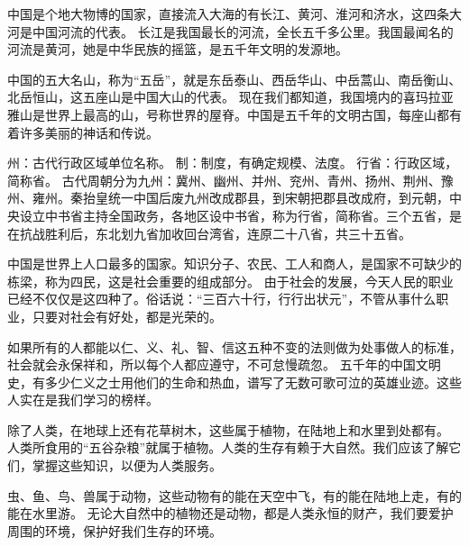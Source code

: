 \documentclass[avery5371,grid]{flashcards}
\begin{document}
{中国是个地大物博的国家，直接流入大海的有长江、黄河、淮河和济水，这四条大河是中国河流的代表。} %
{长江是我国最长的河流，全长五千多公里。我国最闻名的河流是黄河，她是中华民族的摇篮，是五千年文明的发源地。} %

{中国的五大名山，称为“五岳”，就是东岳泰山、西岳华山、中岳蒿山、南岳衡山、北岳恒山，这五座山是中国大山的代表。} %
{现在我们都知道，我国境内的喜玛拉亚雅山是世界上最高的山，号称世界的屋脊。中国是五千年的文明古国，每座山都有着许多美丽的神话和传说。} %

{州：古代行政区域单位名称。 制：制度，有确定规模、法度。 行省：行政区域，简称省。} %
{古代周朝分为九州：冀州、幽州、并州、兖州、青州、扬州、荆州、豫州、雍州。秦抬皇统一中国后废九州改成郡县，到宋朝把郡县改成府，到元朝，中央设立中书省主持全国政务，各地区设中书省，称为行省，简称省。三个五省，是在抗战胜利后，东北划九省加收回台湾省，连原二十八省，共三十五省。} %

{中国是世界上人口最多的国家。知识分子、农民、工人和商人，是国家不可缺少的栋梁，称为四民，这是社会重要的组成部分。} %
{由于社会的发展，今天人民的职业已经不仅仅是这四种了。俗话说：“三百六十行，行行出状元”，不管从事什么职业，只要对社会有好处，都是光荣的。} %




{如果所有的人都能以仁、义、礼、智、信这五种不变的法则做为处事做人的标准，社会就会永保祥和，所以每个人都应遵守，不可怠慢疏忽。} %
{五千年的中国文明史，有多少仁义之士用他们的生命和热血，谱写了无数可歌可泣的英雄业迹。这些人实在是我们学习的榜样。} %


{除了人类，在地球上还有花草树木，这些属于植物，在陆地上和水里到处都有。} %
{人类所食用的“五谷杂粮”就属于植物。人类的生存有赖于大自然。我们应该了解它们，掌握这些知识，以便为人类服务。} %

{虫、鱼、鸟、兽属于动物，这些动物有的能在天空中飞，有的能在陆地上走，有的能在水里游。} %
{无论大自然中的植物还是动物，都是人类永恒的财产，我们要爱护周围的环境，保护好我们生存的环境。} %
\end{document}
